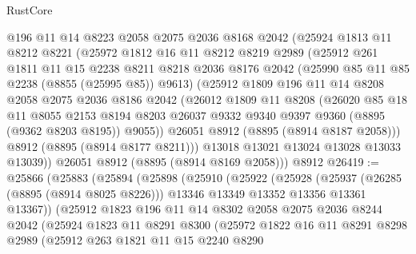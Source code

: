 \begin{lexlean}{RustCore}
\begin{coremodule}
      @196
      @11
      @14
      @8223
      @2058
      @2075
      @2036
      @8168
      @2042
      (@25924
        @1813
        @11
        @8212
        @8221
        (@25972
          @1812
          @16
          @11
          @8212
          @8219
          @2989
          (@25912
            @261
            @1811
            @11
            @15
            @2238
            @8211
            @8218
            @2036
            @8176
            @2042
            (@25990 @85 @11 @85 @2238 (@8855 (@25995 @85)) @9613)
            (@25912
              @1809
              @196
              @11
              @14
              @8208
              @2058
              @2075
              @2036
              @8186
              @2042
              (@26012
                @1809
                @11
                @8208
                (@26020
                  @85
                  @18
                  @11
                  @8055
                  @2153
                  @8194
                  @8203
                  @26037
                  @9332
                  @9340
                  @9397
                  @9360
                  (@8895 (@9362 @8203 @8195))
                  @9055))
              @26051
              @8912
              (@8895 (@8914 @8187 @2058)))
            @8912
            (@8895 (@8914 @8177 @8211)))
          @13018
          @13021
          @13024
          @13028
          @13033
          @13039))
      @26051
      @8912
      (@8895 (@8914 @8169 @2058)))
    @8912
@26419 := @25866
    (@25883
      (@25894
        (@25898
          (@25910
            (@25922
              (@25928
                (@25937
                  (@26285 (@8895 (@8914 @8025 @8226)))
                  @13346
                  @13349
                  @13352
                  @13356
                  @13361
                  @13367))
              (@25912
                @1823
                @196
                @11
                @14
                @8302
                @2058
                @2075
                @2036
                @8244
                @2042
                (@25924
                  @1823
                  @11
                  @8291
                  @8300
                  (@25972
                    @1822
                    @16
                    @11
                    @8291
                    @8298
                    @2989
                    (@25912
                      @263
                      @1821
                      @11
                      @15
                      @2240
                      @8290

\end{coremodule}
\end{lexlean}
